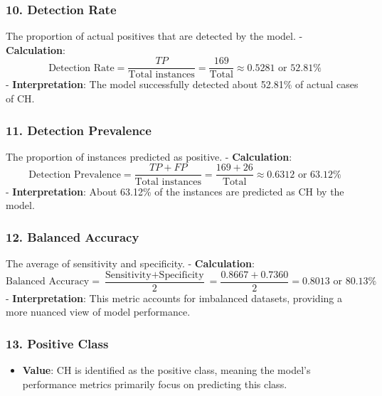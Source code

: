 \documentclass[
]{article}
\providecommand{\tightlist}{%
  \setlength{\itemsep}{0pt}\setlength{\parskip}{0pt}}
\begin{document}
\hypertarget{detection-rate}{%
\subsubsection{\texorpdfstring{10. \textbf{Detection
Rate}}{10. Detection Rate}}\label{detection-rate}}

The proportion of actual positives that are detected by the model. -
\textbf{Calculation}: \[
  \text{Detection Rate} = \frac{TP}{\text{Total instances}} = \frac{169}{\text{Total}} \approx 0.5281 \text{ or } 52.81\%
  \] - \textbf{Interpretation}: The model successfully detected about
52.81\% of actual cases of CH.

\hypertarget{detection-prevalence}{%
\subsubsection{\texorpdfstring{11. \textbf{Detection
Prevalence}}{11. Detection Prevalence}}\label{detection-prevalence}}

The proportion of instances predicted as positive. -
\textbf{Calculation}: \[
  \text{Detection Prevalence} = \frac{TP + FP}{\text{Total instances}} = \frac{169 + 26}{\text{Total}} \approx 0.6312 \text{ or } 63.12\%
  \] - \textbf{Interpretation}: About 63.12\% of the instances are
predicted as CH by the model.

\hypertarget{balanced-accuracy}{%
\subsubsection{\texorpdfstring{12. \textbf{Balanced
Accuracy}}{12. Balanced Accuracy}}\label{balanced-accuracy}}

The average of sensitivity and specificity. - \textbf{Calculation}: \[
  \text{Balanced Accuracy} = \frac{\text{Sensitivity} + \text{Specificity}}{2} = \frac{0.8667 + 0.7360}{2} = 0.8013 \text{ or } 80.13\%
  \] - \textbf{Interpretation}: This metric accounts for imbalanced
datasets, providing a more nuanced view of model performance.

\hypertarget{positive-class}{%
\subsubsection{\texorpdfstring{13. \textbf{Positive
Class}}{13. Positive Class}}\label{positive-class}}

\begin{itemize}
\tightlist
\item
  \textbf{Value}: CH is identified as the positive class, meaning the
  model's performance metrics primarily focus on predicting this class.
\end{itemize}
\end{document}
